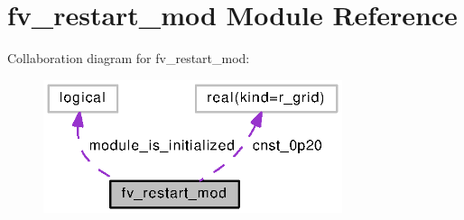 \section{fv\-\_\-restart\-\_\-mod Module Reference}
\label{classfv__restart__mod}


Collaboration diagram for fv\-\_\-restart\-\_\-mod\-:
\nopagebreak
\begin{figure}[H]
\begin{center}
\leavevmode
\includegraphics[width=248pt]{classfv__restart__mod__coll__graph}
\end{center}
\end{figure}
